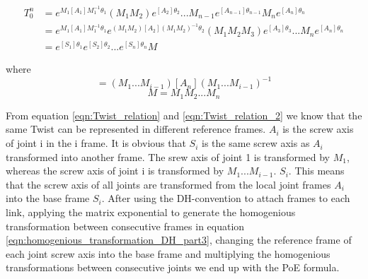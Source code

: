 \documentclass{tpk4170report}
\begin{document}
\begin{equation} \label{eqn:homogenious_transformation_DH_part7}
  \begin{split}
    T_{0}^{n} &=  e^{M_{1}[A_{1}]M_{1}^{-1}\theta_{1}} (M_{1}M_{2}) e^{[A_{2}]\theta_{2}} ... M_{n-1}e^{[A_{n-1}]\theta_{n-1}} M_{n}e^{[A_{n}]\theta_{n}} \\
       & = e^{M_{1}[A_{1}]M_{1}^{-1}\theta_{1}} e^{(M_{1}M_{2})[A_{2}](M_{1}M_{2})^{-1}\theta_{2}} (M_{1}M_{2}M_{3})e^{[A_{3}]\theta_{3}} ... M_{n}e^{[A_{n}]\theta_{n}} \\
       &= e^{[S_{1}]\theta_{1}} e^{[S_{2}]\theta_{2}} ... e^{[S_{n}]\theta_{n}}M
  \end{split}
  \end{equation}

  where 
  \begin{equation}
    [S_{i}] = (M_{1}...M_{i-1})[A_{n}](M_{1}...M_{i-1})^{-1}
    \label{eqn:homogenious_transformation_DH_part8}
  \end{equation}
  \begin{equation}
    M = M_{1}M_{2}...M_{n}
    \label{eqn:homogenious_transformation_DH_part9}
  \end{equation}


From equation \ref{eqn:Twist_relation} and \ref{eqn:Twist_relation_2} we know that the same Twist can be represented in different reference frames. \(A_{i}\) is the screw axis of joint i in the i frame. It is obvious that \(S_{i}\) is the same screw axis as \(A_{i}\)  transformed into another frame. The srew axis of joint 1 is transformed by \(M_{1}\), whereas the screw axis of joint i is transformed by \(M_{1}...M_{i-1}\). \(S_{i}\). This means that the screw axis of all joints are transformed from the local joint frames \(A_{i}\) into the base frame \(S_{i}\). After using the DH-convention to attach frames to each link, applying the matrix exponential to generate the homogenious transformation between consecutive frames in equation \ref{eqn:homogenious_transformation_DH_part3}, changing the reference frame of each joint screw axis into the base frame and multiplying the homogenious transformations between consecutive joints we end up with the PoE formula.
\end{document}
